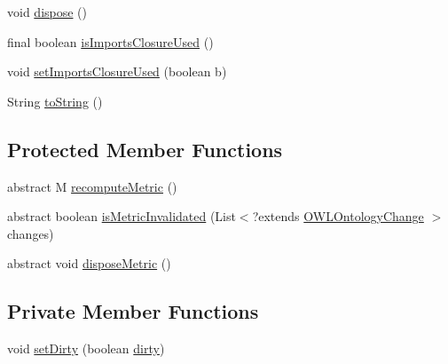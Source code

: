 \begin{DoxyCompactItemize}
\item 
void \hyperlink{classorg_1_1semanticweb_1_1owlapi_1_1metrics_1_1_abstract_o_w_l_metric_3_01_m_01_4_ac2752f8b0ef563313621d80ad22f51af}{dispose} ()
\item 
final boolean \hyperlink{classorg_1_1semanticweb_1_1owlapi_1_1metrics_1_1_abstract_o_w_l_metric_3_01_m_01_4_a3b2d413d3fce38068f161edd67569b96}{is\-Imports\-Closure\-Used} ()
\item 
void \hyperlink{classorg_1_1semanticweb_1_1owlapi_1_1metrics_1_1_abstract_o_w_l_metric_3_01_m_01_4_a835b0657c6ad7d1e5c8fab8e9f752838}{set\-Imports\-Closure\-Used} (boolean b)
\item 
String \hyperlink{classorg_1_1semanticweb_1_1owlapi_1_1metrics_1_1_abstract_o_w_l_metric_3_01_m_01_4_afbbfd40dbfa0bb367e5b2746e5522f52}{to\-String} ()
\end{DoxyCompactItemize}
\subsection*{Protected Member Functions}
\begin{DoxyCompactItemize}
\item 
abstract M \hyperlink{classorg_1_1semanticweb_1_1owlapi_1_1metrics_1_1_abstract_o_w_l_metric_3_01_m_01_4_ab961f805dad593a600155e2d494f19ec}{recompute\-Metric} ()
\item 
abstract boolean \hyperlink{classorg_1_1semanticweb_1_1owlapi_1_1metrics_1_1_abstract_o_w_l_metric_3_01_m_01_4_a7ff8d42d9db9df7b719d49a5b3b75f48}{is\-Metric\-Invalidated} (List$<$?extends \hyperlink{classorg_1_1semanticweb_1_1owlapi_1_1model_1_1_o_w_l_ontology_change}{O\-W\-L\-Ontology\-Change} $>$ changes)
\item 
abstract void \hyperlink{classorg_1_1semanticweb_1_1owlapi_1_1metrics_1_1_abstract_o_w_l_metric_3_01_m_01_4_a9a4c50ae12368757bf1407d688b54e95}{dispose\-Metric} ()
\end{DoxyCompactItemize}
\subsection*{Private Member Functions}
\begin{DoxyCompactItemize}
\item 
void \hyperlink{classorg_1_1semanticweb_1_1owlapi_1_1metrics_1_1_abstract_o_w_l_metric_3_01_m_01_4_a70e931a78b787cd55ec07edb8b6a953e}{set\-Dirty} (boolean \hyperlink{classorg_1_1semanticweb_1_1owlapi_1_1metrics_1_1_abstract_o_w_l_metric_3_01_m_01_4_a43a88335762e10b8abe6dfe9af1bdcf1}{dirty})
\end{DoxyCompactItemize}
